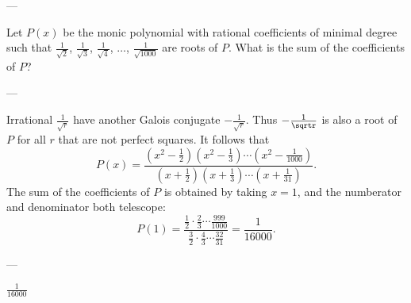 
---

Let $P(x)$ be the monic polynomial with rational coefficients of minimal degree such that $\frac1{\sqrt2}$, $\frac1{\sqrt3}$, $\frac1{\sqrt4}$, $\ldots$, $\frac1{\sqrt{1000}}$ are roots of $P$. What is the sum of the coefficients of $P$?

---

Irrational $\frac1{\sqrt r}$ have another Galois conjugate $-\frac1{\sqrt r}$. Thus $-\frac1{\sqrtr}$ is also a root of $P$ for all $r$ that are not perfect squares. It follows that \[P(x)=\frac{(x^2-\frac12)(x^2-\frac13)\cdots(x^2-\frac1{1000})}{(x+\frac12)(x+\frac13)\cdots(x+\frac1{31})}.\]
The sum of the coefficients of $P$ is obtained by taking $x=1$, and the numberator and denominator both telescope: \[P(1)=\frac{\frac12\cdot\frac23\cdots\frac{999}{1000}}{\frac32\cdot\frac43\cdots\frac{32}{31}}=\frac1{16000}.\]

---

$\frac1{16000}$
